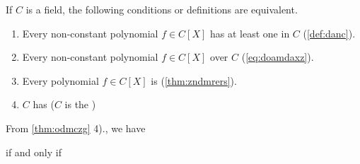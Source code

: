 \documentclass{article}
\begin{document}
\begin{thma}\label{thm:odmczg}
If $C$ is a field, the following conditions or definitions are equivalent.
\begin{enumerate}
    \item Every non-constant polynomial $f \in C[X]$ has at least one  in $C$ (\cref{def:danc}).
    \item Every non-constant polynomial $f \in C[X]$  over $C$ (\cref{eq:doamdaxz}).
    \item Every  polynomial $f \in C[X]$ is  (\cref{thm:zndmrers}).
    \item $C$ has  ($C$ is the )
\end{enumerate}
\end{thma}
\begin{cora}\label{cor:aoimdzcc}From \cref{thm:odmczg} 4)., we have

 
    \centerline{ if and only if }
\end{cora}
\end{document}
